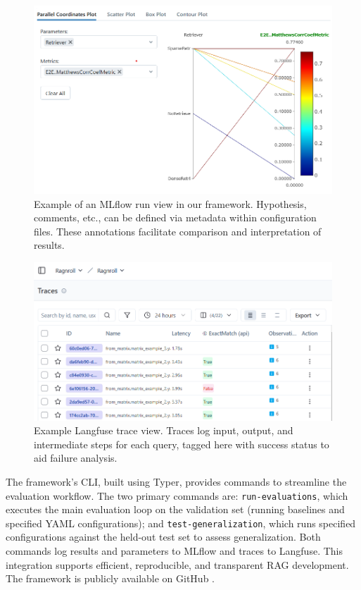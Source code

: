 \begin{figure}[!ht]
  \centering
  \includegraphics[width=\textwidth]{images/MLFlow-Vis.png}
  \caption{Example of an MLflow run view in our framework. Hypothesis, comments, etc., can be defined via metadata within configuration files. These annotations facilitate comparison and interpretation of results.}
  \label{fig:mlflow}
\end{figure}

\begin{figure}[!ht]
\centering
\includegraphics[width=\textwidth]{images/langfuse.png}
\caption{Example Langfuse trace view. Traces log input, output, and intermediate steps for each query, tagged here with success status to aid failure analysis.}
\label{fig:langfuse}
\end{figure}

The framework's CLI, built using Typer, provides commands to streamline the evaluation workflow. The two primary commands are: \texttt{run-evaluations}, which executes the main evaluation loop on the validation set (running baselines and specified YAML configurations); and \texttt{test-generalization}, which runs specified configurations against the held-out test set to assess generalization. Both commands log results and parameters to MLflow and traces to Langfuse. This integration supports efficient, reproducible, and transparent RAG development. The framework is publicly available on GitHub \cite{albrecht-2025}.

